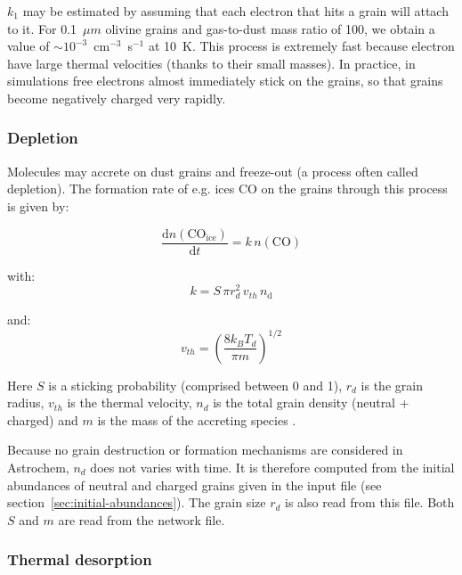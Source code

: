 \documentclass[a4paper,12pt]{article}
\newcommand{\conc}[1]{n(\mathrm{#1})}
\begin{document}
$k_{1}$ may be estimated by assuming that each electron that hits a
grain will attach to it. For 0.1~$\mu m$ olivine grains and
gas-to-dust mass ratio of 100, we obtain a value of $\sim
10^{-3}$~cm$^{-3}$~s$^{-1}$ at 10~K. This process is extremely fast
because electron have large thermal velocities (thanks to their small
masses). In practice, in simulations free electrons almost immediately
stick on the grains, so that grains become negatively charged very
rapidly.

\subsubsection{Depletion}
\label{sec:depletion}

Molecules may accrete on dust grains and freeze-out (a process often
called depletion). The formation rate of e.g. ices CO on the grains
through this process is given by:

\begin{equation}
  \frac{\mathrm{d}\conc{CO_{ice}}}{\mathrm{d}t} = k \, \conc{CO}
\end{equation}

\noindent
with:
\begin{equation}
  k = S \, \pi r_{d}^2 \, v_{th} \, n_\mathrm{d}
  \label{eq:freeze-out}
\end{equation}

\noindent
and:
\begin{equation}
  v_{th} = \left( \frac{8 k_{B} T_{d}}{\pi m} \right)^{1/2}
  \label{eq:thermal-veloc}
\end{equation}

\noindent
Here $S$ is a sticking probability (comprised between 0 and 1),
$r_{d}$ is the grain radius, $v_{th}$ is the thermal velocity, $n_{d}$
is the total grain density (neutral + charged) and $m$ is the mass of
the accreting species \citep{Bergin95}.

Because no grain destruction or formation mechanisms are considered in
Astrochem, $n_{d}$ does not varies with time. It is therefore computed
from the initial abundances of neutral and charged grains given in the
input file (see section~\ref{sec:initial-abundances}). The grain size
$r_{d}$ is also read from this file. Both $S$ and $m$ are read from
the network file.

\subsubsection{Thermal desorption}
\label{sec:thermal-desorption}
\end{document}

